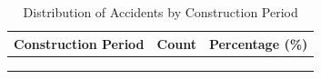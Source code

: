 \documentclass[
]{article}
\begin{document}
\begin{longtable}[t]{lrr}
\caption{\label{tab:period_counts_table}Distribution of Accidents by Construction Period}\\
\toprule
\textbf{Construction Period} & \textbf{Count} & \textbf{Percentage (\%)}\\
\midrule
\cellcolor[HTML]{f5f5f5}{\cellcolor{gray!10}{after}} & \cellcolor[HTML]{e8e8e8}{\cellcolor{gray!10}{381112}} & \cellcolor[HTML]{f5f5f5}{\cellcolor{gray!10}{29.8}}\\
\cellcolor[HTML]{f5f5f5}{before} & \cellcolor[HTML]{e8e8e8}{590600} & \cellcolor[HTML]{f5f5f5}{46.1}\\
\cellcolor[HTML]{f5f5f5}{\cellcolor{gray!10}{during}} & \cellcolor[HTML]{e8e8e8}{\cellcolor{gray!10}{308601}} & \cellcolor[HTML]{f5f5f5}{\cellcolor{gray!10}{24.1}}\\
\bottomrule
\end{longtable}
\end{document}
